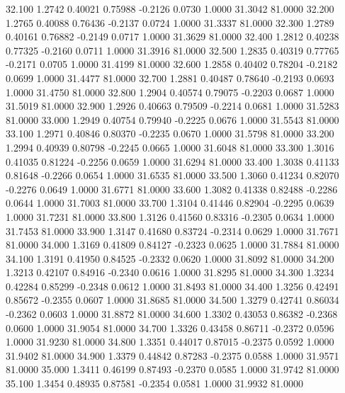   32.100   1.2742   0.40021   0.75988  -0.2126   0.0730   1.0000  31.3042  81.0000
  32.200   1.2765   0.40088   0.76436  -0.2137   0.0724   1.0000  31.3337  81.0000
  32.300   1.2789   0.40161   0.76882  -0.2149   0.0717   1.0000  31.3629  81.0000
  32.400   1.2812   0.40238   0.77325  -0.2160   0.0711   1.0000  31.3916  81.0000
  32.500   1.2835   0.40319   0.77765  -0.2171   0.0705   1.0000  31.4199  81.0000
  32.600   1.2858   0.40402   0.78204  -0.2182   0.0699   1.0000  31.4477  81.0000
  32.700   1.2881   0.40487   0.78640  -0.2193   0.0693   1.0000  31.4750  81.0000
  32.800   1.2904   0.40574   0.79075  -0.2203   0.0687   1.0000  31.5019  81.0000
  32.900   1.2926   0.40663   0.79509  -0.2214   0.0681   1.0000  31.5283  81.0000
  33.000   1.2949   0.40754   0.79940  -0.2225   0.0676   1.0000  31.5543  81.0000
  33.100   1.2971   0.40846   0.80370  -0.2235   0.0670   1.0000  31.5798  81.0000
  33.200   1.2994   0.40939   0.80798  -0.2245   0.0665   1.0000  31.6048  81.0000
  33.300   1.3016   0.41035   0.81224  -0.2256   0.0659   1.0000  31.6294  81.0000
  33.400   1.3038   0.41133   0.81648  -0.2266   0.0654   1.0000  31.6535  81.0000
  33.500   1.3060   0.41234   0.82070  -0.2276   0.0649   1.0000  31.6771  81.0000
  33.600   1.3082   0.41338   0.82488  -0.2286   0.0644   1.0000  31.7003  81.0000
  33.700   1.3104   0.41446   0.82904  -0.2295   0.0639   1.0000  31.7231  81.0000
  33.800   1.3126   0.41560   0.83316  -0.2305   0.0634   1.0000  31.7453  81.0000
  33.900   1.3147   0.41680   0.83724  -0.2314   0.0629   1.0000  31.7671  81.0000
  34.000   1.3169   0.41809   0.84127  -0.2323   0.0625   1.0000  31.7884  81.0000
  34.100   1.3191   0.41950   0.84525  -0.2332   0.0620   1.0000  31.8092  81.0000
  34.200   1.3213   0.42107   0.84916  -0.2340   0.0616   1.0000  31.8295  81.0000
  34.300   1.3234   0.42284   0.85299  -0.2348   0.0612   1.0000  31.8493  81.0000
  34.400   1.3256   0.42491   0.85672  -0.2355   0.0607   1.0000  31.8685  81.0000
  34.500   1.3279   0.42741   0.86034  -0.2362   0.0603   1.0000  31.8872  81.0000
  34.600   1.3302   0.43053   0.86382  -0.2368   0.0600   1.0000  31.9054  81.0000
  34.700   1.3326   0.43458   0.86711  -0.2372   0.0596   1.0000  31.9230  81.0000
  34.800   1.3351   0.44017   0.87015  -0.2375   0.0592   1.0000  31.9402  81.0000
  34.900   1.3379   0.44842   0.87283  -0.2375   0.0588   1.0000  31.9571  81.0000
  35.000   1.3411   0.46199   0.87493  -0.2370   0.0585   1.0000  31.9742  81.0000
  35.100   1.3454   0.48935   0.87581  -0.2354   0.0581   1.0000  31.9932  81.0000
